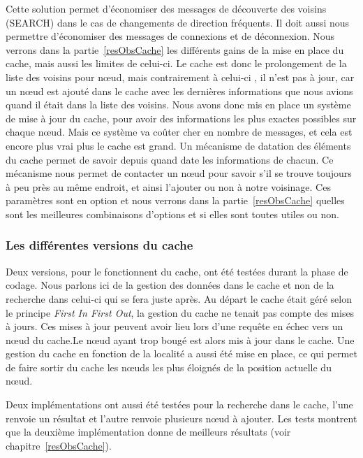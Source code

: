 \par Cette solution permet d'économiser des messages de découverte des voisins (SEARCH) dans le cas de changements de direction fréquents. Il doit aussi nous permettre d'économiser des messages de connexions et de déconnexion. Nous verrons dans la partie~\ref{resObsCache} les différents gains de la mise en place du cache, mais aussi les limites de celui-ci. Le cache est donc le prolongement de la liste des voisins pour nœud, mais contrairement à celui-ci , il n'est pas à jour, car un nœud est ajouté dans le cache avec les dernières informations que nous avions quand il était dans la liste des voisins. Nous avons donc mis en place un système de mise à jour du cache, pour avoir des informations les plus exactes possibles sur chaque nœud. Mais ce système va coûter cher en nombre de messages, et cela est encore plus vrai plus le cache est grand. Un mécanisme de datation des éléments du cache permet de savoir depuis quand date les informations de chacun. Ce mécanisme nous permet de contacter un nœud pour savoir s'il se trouve toujours à peu près au même endroit, et ainsi l'ajouter ou non à notre voisinage. Ces paramètres sont en option et nous verrons dans la partie~\ref{resObsCache} quelles sont les meilleures combinaisons d'options et si elles sont toutes utiles ou non.

\subsubsection{Les différentes versions du cache}

Deux versions, pour le fonctionnent du cache, ont été testées durant la phase de codage. Nous parlons ici de la gestion des données dans le cache et non de la recherche dans celui-ci qui se fera juste après. Au départ le cache était géré selon le principe \textit{First In First Out}, la gestion du cache ne tenait pas compte des mises à jours.  Ces mises à jour peuvent avoir lieu lors d'une requête en échec vers un nœud du cache.Le nœud ayant trop bougé est alors mis à jour dans le cache. Une gestion du cache en fonction de la localité a aussi été mise en place, ce qui permet de faire sortir du cache les nœuds les plus éloignés de la position actuelle du nœud.
\par Deux implémentations ont aussi été testées pour la recherche dans le cache, l'une renvoie un résultat et l'autre renvoie plusieurs nœud à ajouter. Les tests montrent que la deuxième implémentation donne de meilleurs résultats (voir chapitre~\ref{resObsCache}).


